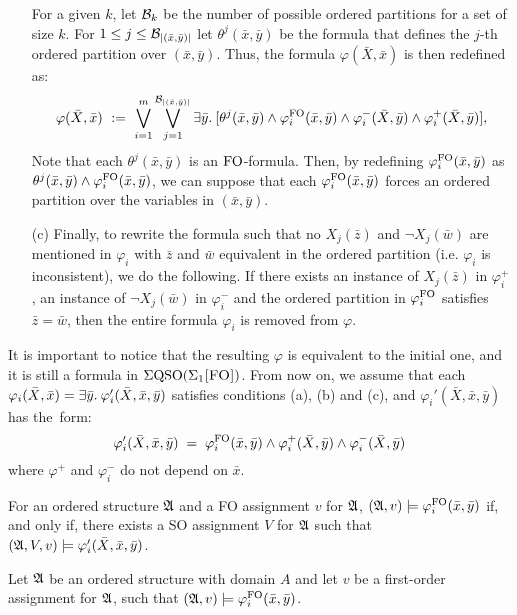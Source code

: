 \begin{itemize}
	For a given $k$, let $\mathcal{B}_k$ be the number of possible ordered partitions for a set of size $k$. For $1 \leq j \leq \mathcal{B}_{\vert (\bar{x},\bar{y}) \vert}$ 
	let $\theta^j(\bar{x},\bar{y})$ be the formula that defines the $j$-th ordered partition over $(\bar{x},\bar{y})$. 
	Thus, the formula $\varphi(\bar{X},\bar{x})$ is then redefined as:
	$$
	\varphi(\bar{X},\bar{x}) \ := \ \bigvee_{i = 1}^m \bigvee_{j = 1}^{\mathcal{B}_{\vert (\bar{x},\bar{y}) \vert}} \exists{\bar{y}}.\: [\theta^j(\bar{x},\bar{y})\wedge \varphi_i^{{\rm FO}}(\bar{x},\bar{y}) \wedge \varphi_i^{-}(\bar{X},\bar{y}) \wedge \varphi_i^{+}(\bar{X},\bar{y})],
	$$
	Note that each $\theta^j(\bar{x},\bar{y})$ is an ${\rm FO}$-formula.
	Then, by redefining $\varphi_i^{{\rm FO}}(\bar{x},\bar{y})$  as $\theta^j(\bar{x},\bar{y})\wedge \varphi_i^{{\rm FO}}(\bar{x},\bar{y})$, we can suppose that each $\varphi_i^{{\rm FO}}(\bar{x},\bar{y})$ forces an ordered partition over the variables in $(\bar{x},\bar{y})$.
	\item[(c)] Finally, to rewrite the formula such that no $X_j(\bar{z})$ and $\neg X_j(\bar{w})$ are mentioned in $\varphi_i$ with $\bar{z}$ and $\bar{w}$ equivalent in the ordered partition (i.e. $\varphi_i$ is inconsistent), we do the following. If there exists an instance of $X_j(\bar{z})$ in $\varphi^{+}_i$, an instance of $\neg X_j(\bar{w})$ in $\varphi^{-}_i$ and the ordered partition in $\varphi^{{\rm FO}}_i$ satisfies $\bar{z} = \bar{w}$, then the entire formula $\varphi_i$ is removed from $\varphi$.
\end{itemize}
It is important to notice that the resulting $\varphi$ is equivalent to the initial one, and it is still a formula in $\Sigma{\rm QSO}(\Sigma_{1}\textsc{[FO]})$. From now on, we assume that each $\varphi_i(\bar{X},\bar{x}) = \exists{\bar{y}}.\:  \varphi_i'(\bar{X},\bar{x}, \bar{y}) $ satisfies conditions (a), (b) and (c), and $\varphi_i'(\bar{X},\bar{x}, \bar{y})$ has the~form:
$$
\varphi_i'(\bar{X},\bar{x}, \bar{y}) \; = \; \varphi^{{\rm FO}}_i(\bar{x},\bar{y}) \wedge \varphi^{+}_i(\bar{X}, \bar{y}) \wedge \varphi^{-}_i(\bar{X},\bar{y}) 
$$
where $\varphi^{+}$ and $\varphi^{-}_i$ do not depend on  $\bar{x}$.
\begin{clm}\label{claim:minusone}
	For an ordered structure $\mathfrak{A}$ and a FO assignment $v$ for $\mathfrak{A}$, $(\mathfrak{A},v)\models\varphi^{{\rm FO}}_i(\bar{x},\bar{y})$ if, and only if, there exists a SO assignment $V$ for $\mathfrak{A}$ such that $(\mathfrak{A},V,v)\models \varphi_i'(\bar{X},\bar{x}, \bar{y})$.
\end{clm}
\proof
	Let $\mathfrak{A}$ be an ordered structure with domain $A$ and let $v$ be a first-order assignment for $\mathfrak{A}$, such that $(\mathfrak{A},v)\models\varphi^{{\rm FO}}_i(\bar{x},\bar{y})$.
